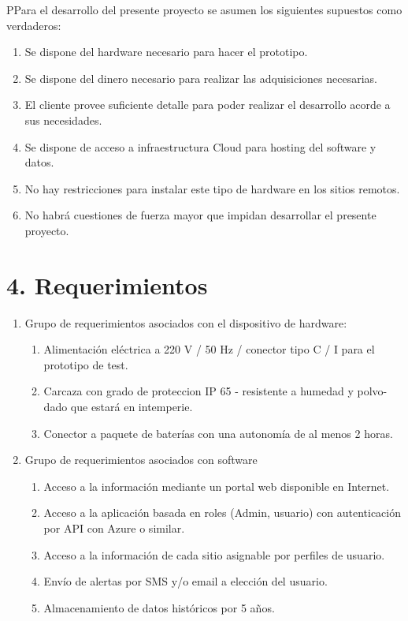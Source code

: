 \documentclass[11pt]{charter}
\begin{document}
\begin{consigna}
PPara el desarrollo del presente proyecto se asumen los siguientes supuestos como verdaderos: 

\begin{enumerate}
\item Se dispone del hardware necesario para hacer el prototipo.
\item Se dispone del dinero necesario para realizar las adquisiciones necesarias.
\item El cliente provee suficiente detalle para poder realizar el desarrollo acorde a sus necesidades.
\item Se dispone de acceso a infraestructura Cloud para hosting del software y datos.
\item No hay restricciones para instalar este tipo de hardware en los sitios remotos.
\item No habrá cuestiones de fuerza mayor que impidan desarrollar el presente proyecto.
\end{enumerate}

\end{consigna}

\section{4. Requerimientos}
\label{sec:requerimientos}

\begin{consigna}
\begin{enumerate}
\item Grupo de requerimientos asociados con el dispositivo de hardware:
	\begin{enumerate}
	\item Alimentación eléctrica a 220 V / 50 Hz / conector tipo C / I para el prototipo de test.	
	\item Carcaza con grado de proteccion IP 65 - resistente a humedad y polvo- dado que estará en intemperie.
	\item Conector a paquete de baterías con una autonomía de al menos 2 horas.
	\end{enumerate}
\item Grupo de requerimientos asociados con software
	\begin{enumerate}
	\item Acceso a la información mediante un portal web disponible en Internet.
	\item Acceso a la aplicación basada en roles (Admin, usuario) con autenticación por API con Azure o similar. 
	\item Acceso a la información de cada sitio asignable por perfiles de usuario.
	\item Envío de alertas por SMS y/o email a elección del usuario.
	\item Almacenamiento de datos históricos por 5 años.
	\end{enumerate}
\end{enumerate}

\end{consigna}
\end{document}
